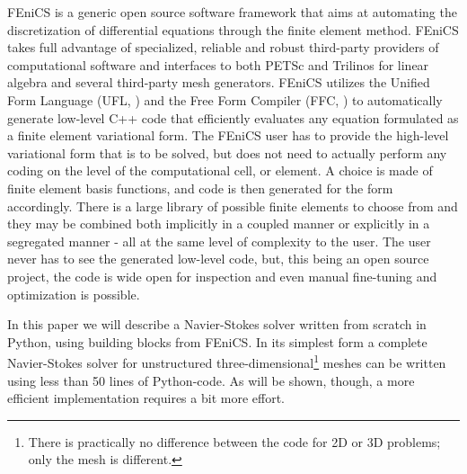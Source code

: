 \documentclass[final,3p,times,twocolumn]{elsarticle}
\begin{document}

FEniCS \cite{fenics} is a generic open source software framework that aims at automating the discretization of differential equations through the finite element method. FEniCS takes full advantage of specialized, reliable and robust third-party providers of computational software and interfaces to both PETSc and Trilinos for linear algebra and several third-party mesh generators. FEniCS utilizes the Unified Form Language (UFL, \cite{ufl}) and the Free Form Compiler (FFC, \cite{Kirby:2006}) to automatically generate low-level C++ code that efficiently evaluates any equation formulated as a finite element variational form. The FEniCS user has to provide the high-level variational form that is to be solved, but does not need to actually perform any coding on the level of the computational cell, or element. A choice is made of finite element basis functions, and code is then generated for the form accordingly. There is a large library of possible finite elements to choose from and they may be combined both implicitly in a coupled manner or explicitly in a segregated manner - all at the same level of complexity to the user. The user never has to see the generated low-level code, but, this being an open source project, the code is wide open for inspection and even manual fine-tuning and optimization is possible.

In this paper we will describe a Navier-Stokes solver written from scratch in Python, using building blocks from FEniCS. In its simplest form a complete Navier-Stokes solver for unstructured three-dimensional\footnote{There is practically no difference between the code for 2D or 3D problems; only the mesh is different.} meshes can be written using less than 50 lines of Python-code. As will be shown, though, a more efficient implementation requires a bit more effort.
\end{document}
